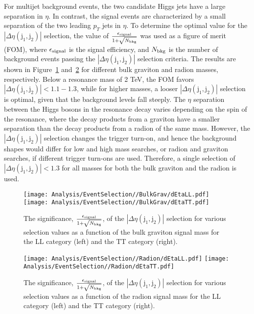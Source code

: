 For multijet background events, the two candidate Higgs jets have a large separation in $\eta$. In contrast, the signal events are characterized by a small separation of the two leading $p_{T}$ jets in $\eta$. To determine the optimal value for the $|\Delta\eta(\mathrm{j}_{1}, \mathrm{j}_{2})|$ selection, the value of $\frac{\epsilon_{\rm signal}}{1 + \sqrt{N_{\rm bkg}}}$ was used as a figure of merit (FOM), where $\epsilon_{\rm signal}$ is the signal efficiency, and $N_{\rm bkg}$ is the number of background events passing the $|\Delta\eta(\mathrm{j}_{1}, \mathrm{j}_{2})|$ selection criteria. The results are shown in Figure~\ref{fig:app_DetaSig_BG} and~\ref{fig:app_DetaSig_Radion} for different bulk graviton and radion masses, respectively. Below a resonance mass of 2 TeV, the FOM favors $|\Delta\eta(\mathrm{j}_{1}, \mathrm{j}_{2})| < 1.1-1.3$, while for higher masses, a looser $|\Delta\eta(\mathrm{j}_{1}, \mathrm{j}_{2})|$ selection is optimal, given that the background levels fall steeply. The $\eta$ separation between the Higgs bosons in the resonance decay varies depending on the spin of the resonance, where the decay products from a graviton have a smaller separation than the decay products from a radion of the same mass. However, the $|\Delta\eta(\mathrm{j}_{1}, \mathrm{j}_{2})|$ selection changes the trigger turn-on, and hence the background shapes would differ for low and high mass searches, or radion and graviton searches, if different trigger turn-ons are used. Therefore, a single selection of $|\Delta\eta(\mathrm{j}_{1}, \mathrm{j}_{2})| < 1.3$ for all masses for both the bulk graviton and the radion is used.

\begin{figure}[h!]
  \centering
    \texttt{[image: Analysis/EventSelection//BulkGrav/dEtaLL.pdf]}
    \texttt{[image: Analysis/EventSelection//BulkGrav/dEtaTT.pdf]}
  \caption{The significance, $\frac{\epsilon_{\rm signal}}{1 + \sqrt{N_{\rm bkg}}}$, of the $|\Delta\eta(\mathrm{j}_{1}, \mathrm{j}_{2})|$ selection for various selection values as a function of the bulk graviton signal mass for the LL category (left) and the TT category (right).} \label{fig:app_DetaSig_BG}
\end{figure}

\begin{figure}[h!]
  \centering
    \texttt{[image: Analysis/EventSelection//Radion/dEtaLL.pdf]}
    \texttt{[image: Analysis/EventSelection//Radion/dEtaTT.pdf]}
  \caption{The significance, $\frac{\epsilon_{\rm signal}}{1 + \sqrt{N_{\rm bkg}}}$, of the $|\Delta\eta(\mathrm{j}_{1}, \mathrm{j}_{2})|$ selection for various selection values as a function of the radion signal mass for the LL category (left) and the TT category (right).} \label{fig:app_DetaSig_Radion}
\end{figure}


